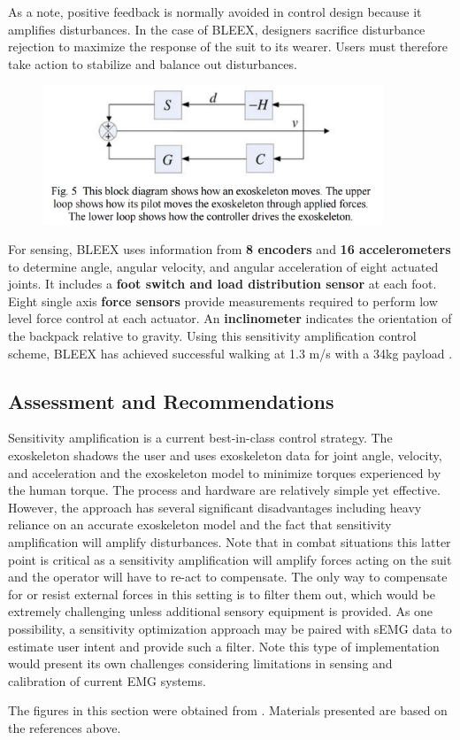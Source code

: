 As a note, positive feedback is normally avoided in control design because it amplifies disturbances.  In the case of BLEEX, designers sacrifice disturbance rejection to maximize the response of the suit to its wearer.  Users must therefore take action to stabilize and balance out disturbances.

\begin{figure}[ht]
  \centering
  \includegraphics[width=4.0in]{exos/figs/bleex_control_diag_3.png}
\end{figure}

For sensing, BLEEX uses information from \textbf{8 encoders} and \textbf{16 accelerometers} to determine angle, angular velocity, and angular acceleration of eight actuated joints. It includes a \textbf{foot switch and load distribution sensor} at each foot. Eight single axis \textbf{force sensors} provide measurements required to perform low level force control at each actuator. An \textbf{inclinometer} indicates the orientation of the backpack relative to gravity. Using this sensitivity amplification control scheme, BLEEX has achieved successful walking at 1.3 m/s with a 34kg payload \cite{sesitivityAmpPaper2005}.

\subsection{Assessment and Recommendations}

Sensitivity amplification is a current best-in-class control strategy.  The exoskeleton shadows the user and uses exoskeleton data for joint angle, velocity, and acceleration and the exoskeleton model to minimize torques experienced by the human torque.  The process and hardware are relatively simple yet effective.   However, the approach has several significant disadvantages including heavy reliance on an accurate exoskeleton model and the fact that sensitivity amplification will amplify disturbances.  Note that in combat situations this latter point is critical as a sensitivity amplification will amplify forces acting on the suit and the operator will have to re-act to compensate.  The only way to compensate for or resist external forces in this setting is to filter them out, which would be extremely challenging unless additional sensory equipment is provided.  As one possibility, a sensitivity optimization approach may be paired with sEMG data to estimate user intent and provide such a filter.  Note this type of implementation would present its own challenges considering limitations in sensing and calibration of current EMG systems. 





The figures in this section were obtained from \cite{sesitivityAmpPaper2005}. Materials presented are based on the references above.
